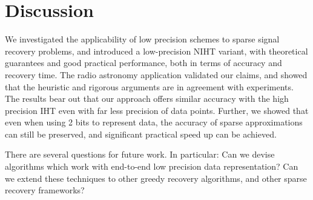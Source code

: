 \documentclass[aoas,preprint]{imsart}
\numberwithin{equation}{section}
\theoremstyle{plain}
\begin{document}
{\section{Discussion}\label{section_discussion}
We investigated the applicability of low precision schemes to sparse signal recovery problems, and introduced a low-precision NIHT variant, with theoretical guarantees and good practical performance, both in terms of accuracy and recovery time. 
The radio astronomy application validated our claims, and showed that the heuristic and rigorous arguments are in agreement with experiments. The results bear out that our approach offers similar accuracy with the high precision IHT even with far less precision of data points. Further, we showed that even when using 2 bits to represent data,  the accuracy of sparse approximations can still be preserved, and significant practical speed up can be achieved.
\vspace{0.5em}

There are several questions for future work. In particular: Can we devise algorithms which work with end-to-end low precision data representation? Can we extend these techniques to other greedy recovery algorithms, and other sparse recovery frameworks?

}
\end{document}
